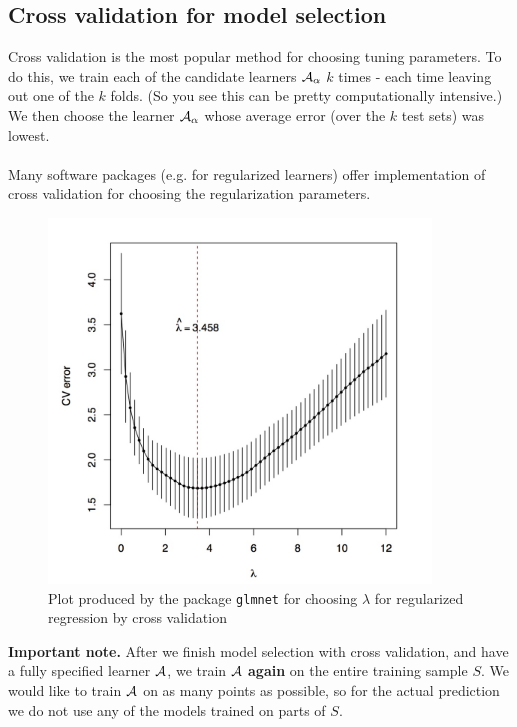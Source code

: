   \subsection{Cross validation for model selection}
  Cross validation is the most popular method for choosing tuning parameters.
  To do this, we train each of the candidate learners $\mathcal{A}_\alpha$ $k$ times -
  each time leaving out one of the $k$ folds. (So you see this can be pretty
  computationally intensive.) We then choose the learner $\mathcal{A}_\alpha$ whose
  average error (over the $k$ test sets) was lowest.
\\~\\
  Many software packages (e.g. for regularized learners) offer implementation of cross
  validation for choosing the regularization parameters.

  
  \begin{figure}[H]
    \centering
  \includegraphics[width=4in]{cv_lambda.jpeg}  
      \caption{Plot produced by the package {\tt glmnet} for choosing $\lambda$
      for regularized regression by cross validation}
  \end{figure}

  {\bf Important note.} After we finish model selection with cross validation,
  and have a fully specified learner $\mathcal{A}$, we train $\mathcal{A}$ {\bf again} on the
  entire training sample $S$. We would like to train $\mathcal{A}$ on as many points as
  possible, so for the actual prediction we do not use any of the models trained
  on parts of $S$.

